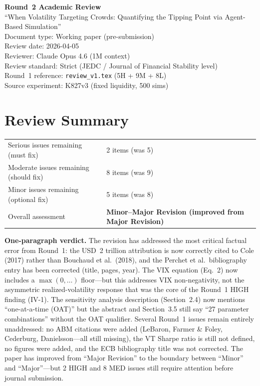 \documentclass[12pt,a4paper]{article}
\begin{document}
\begin{center}
{\Large\bfseries Round~2 Academic Review}\\[0.5em]
{\large ``When Volatility Targeting Crowds: Quantifying the Tipping Point via Agent-Based Simulation''}\\[0.5em]
{\normalsize Document type: Working paper (pre-submission)}\\
{\normalsize Review date: 2026-04-05}\\
{\normalsize Reviewer: Claude Opus 4.6 (1M context)}\\
{\normalsize Review standard: Strict (JEDC / Journal of Financial Stability level)}\\
{\normalsize Round~1 reference: \texttt{review\_v1.tex} (5H + 9M + 8L)}\\
{\normalsize Source experiment: K827v3 (fixed liquidity, 500 sims)}
\end{center}

\vspace{1em}

\section*{Review Summary}

\begin{tabular}{ll}
\textcolor{errorred}{Serious issues remaining (must fix)} & 2 items (was 5) \\
\textcolor{warncolor}{Moderate issues remaining (should fix)} & 8 items (was 9) \\
Minor issues remaining (optional fix) & 5 items (was 8) \\
Overall assessment & \textbf{Minor--Major Revision (improved from Major Revision)} \\
\end{tabular}

\medskip

\noindent\textbf{One-paragraph verdict.}
The revision has addressed the most critical factual error from Round~1: the USD~2 trillion attribution is now correctly cited to Cole (2017) rather than Bouchaud et al.\ (2018), and the Perchet et al.\ bibliography entry has been corrected (title, pages, year). The VIX equation (Eq.~2) now includes a $\max(0,\ldots)$ floor---but this addresses VIX non-negativity, not the asymmetric realized-volatility response that was the core of the Round~1 HIGH finding (IV-1). The sensitivity analysis description (Section~2.4) now mentions ``one-at-a-time (OAT)'' but the abstract and Section~3.5 still say ``27 parameter combinations'' without the OAT qualifier. Several Round~1 issues remain entirely unaddressed: no ABM citations were added (LeBaron, Farmer \& Foley, Cederburg, Danielsson---all still missing), the VT Sharpe ratio is still not defined, no figures were added, and the ECB bibliography title was not corrected. The paper has improved from ``Major Revision'' to the boundary between ``Minor'' and ``Major''---but 2 HIGH and 8 MED issues still require attention before journal submission.
\end{document}
